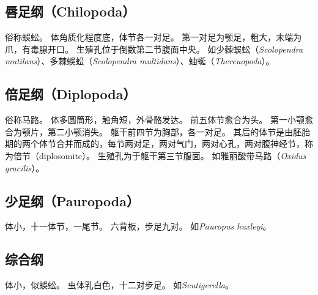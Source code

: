 \documentclass[11pt]{article}
\begin{document}
\subsection{唇足纲（Chilopoda）}
俗称蜈蚣。
体角质化程度底，体节各一对足。
第一对足为颚足，粗大，末端为爪，有毒腺开口。
生殖孔位于倒数第二节腹面中央。
如少棘蜈蚣（\textit{Scolopendra mutilans}）、多棘蜈蚣（\textit{Scolopendra multidans}）、蚰蜒（\textit{Thereuopoda}）。

\subsection{倍足纲（Diplopoda）}
俗称马路。
体多圆筒形，触角短，外骨骼发达。
前五体节愈合为头。
第一小颚愈合为颚片，第二小颚消失。
躯干前四节为胸部，各一对足。
其后的体节是由胚胎期的两个体节合并而成的，每节两对足，两对气门，两对心孔，两对腹神经节，称为倍节（diplosomite）。
生殖孔为于躯干第三节腹面。
如雅丽酸带马路（\textit{Oxidus gracilis}）。

\subsection{少足纲（Pauropoda）}
体小，十一体节，一尾节。
六背板，步足九对。
如\textit{Pauropus huxleyi}。

\subsection{综合纲}
体小，似蜈蚣。
虫体乳白色，十二对步足。
如\textit{Scutigerella}。
\end{document}
